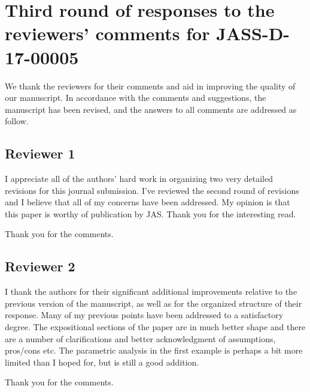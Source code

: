\documentclass[11pt]{article}
\begin{document}

\section*{Third round of responses to the reviewers' comments for JASS-D-17-00005}

We thank the reviewers for their comments and aid in improving the quality of our manuscript. 
In accordance with the comments and suggestions, the manuscript has been revised, and the answers to all comments are addressed as follow.

\subsection*{Reviewer 1}
\begin{itshape}
    I appreciate all of the authors' hard work in organizing two very detailed revisions for this journal submission.  I've reviewed the second round of revisions and I believe that all of my concerns have been addressed.  My opinion is that this paper is worthy of publication by JAS.  Thank you for the interesting read.
\end{itshape}

Thank you for the comments.

\subsection*{Reviewer 2}
\begin{itshape}
    I thank the authors for their significant additional improvements relative
    to the previous version of the manuscript, as well as for the organized
    structure of their response.  Many of my previous points have been
    addressed to a satisfactory degree.  The expositional sections of the paper
    are in much better shape and there are a number of clarifications and
    better acknowledgment of assumptions, pros/cons etc.  The parametric
    analysis in the first example is perhaps a bit more limited than I hoped
    for, but is still a good addition.
\end{itshape}

Thank you for the comments. 
\end{document}
